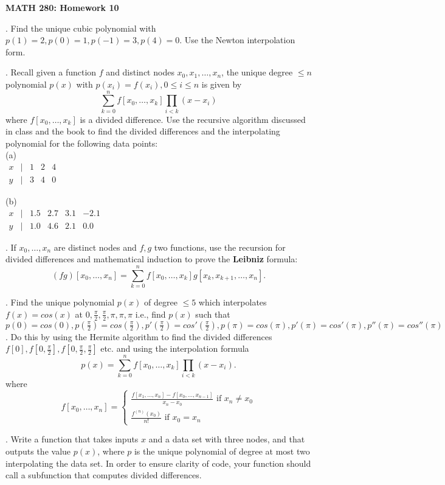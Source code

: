 \documentclass[12 pt]{article}
\begin{document}
\centerline{\bf MATH 280: Homework 10 }

\bigskip

. Find the unique cubic polynomial with $p(1)=2, p(0)=1, p(-1)=3, p(4)=0$. Use the Newton interpolation form. \\

\medskip

\noindent
\medskip

. Recall given a function $f$ and distinct nodes $x_0, x_1, \dots, x_n$, the unique degree $\leq n$ polynomial $p(x)$ with $p(x_i)=f(x_i), 0 \leq i \leq n$ 
is given by 
$$
\sum_{k=0}^n f[x_0,\dots,x_k] \prod_{i < k} (x-x_i)
$$
where $f[x_0,\dots,x_k]$ is a divided difference. Use the recursive algorithm discussed in class and the book to find the divided differences and 
the interpolating polynomial for the following data points: \\
(a) \\
$\begin{matrix} x & | & 1 & 2 & 4 
\\  y & | & 3 & 4 & 0
\end{matrix}$

\noindent
(b) \\
$\begin{matrix} x & | & 1.5 & 2.7 & 3.1 & -2.1 \\
y & | & 1.0 & 4.6 & 2.1 & 0.0 
\end{matrix}
$

\medskip

. If $x_0, \dots, x_n$ are distinct nodes and $f, g$ two functions, use the recursion for divided differences and mathematical induction to 
prove the {\bf Leibniz} formula:
$$
(fg)[x_0, \dots, x_n] = \sum_{k=0}^n f[x_0,\dots,x_k]g[x_k, x_{k+1}, \dots, x_n].
$$

\medskip

. Find the unique polynomial $p(x)$ of degree $\leq 5$ which interpolates $f(x)=cos(x)$ at $0,\frac{\pi}{2},\frac{\pi}{2}, \pi, \pi, \pi$ i.e., find 
$p(x)$ such that $p(0)=cos(0), p(\frac{\pi}{2})=cos(\frac{\pi}{2}), p'(\frac{\pi}{2})=cos'(\frac{\pi}{2}), p(\pi)=cos(\pi), p'(\pi)=cos'(\pi), p''(\pi)=cos''(\pi)$. 
Do this by using the Hermite algorithm to find the divided differences \\ $f[0], f[0, \frac{\pi}{2}], f[0, \frac{\pi}{2}, \frac{\pi}{2}]$ etc. and using the interpolation formula 
$$
p(x) = \sum_{k=0}^n f[x_0,\dots, x_k] \prod_{i < k} (x-x_i).
$$
where
$$
f[x_0, \dots, x_n] = \begin{cases} \frac{f[x_1,\dots,x_n] - f[x_0, \dots, x_{n-1}]}{x_n-x_0} \text{ if } x_n \neq x_0 \\
\frac{f^{(n)}(x_0)}{n!} \text{ if } x_0=x_n
\end{cases}
$$

. Write a function that takes inputs $x$ and a data set with three nodes,
and that outputs the value $p(x)$, where $p$ is the unique polynomial
of degree at most two interpolating the data set. In order to ensure
clarity of code, your function should call a subfunction
that computes divided differences.
\end{document}
